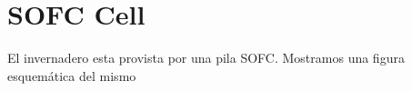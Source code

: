 \chapter{SOFC Cell}

El invernadero esta provista por una pila SOFC. Mostramos una figura esquemática del mismo


\begin{figure}
    
\end{figure}